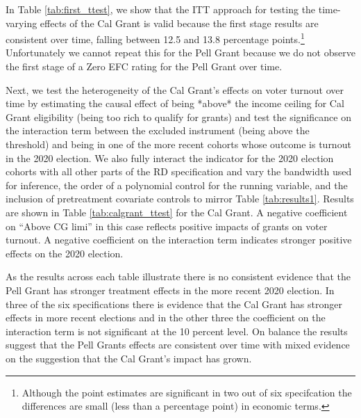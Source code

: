 \documentclass[12pt,letterpaper,oneside]{book}
\begin{document}
In Table \ref{tab:first_ttest}, we show that the ITT approach for testing the time-varying effects of the Cal Grant is valid because the first stage results are consistent over time, falling between 12.5 and 13.8 percentage points.\footnote{Although the point estimates are significant in two out of six specifcation the differences are small (less than a percentage point) in economic terms.} Unfortunately we cannot repeat this for the Pell Grant because we do not observe the first stage of a Zero EFC rating for the Pell Grant over time.

Next, we test the heterogeneity of the Cal Grant's effects on voter turnout over time by estimating the causal effect of being *above* the income ceiling for Cal Grant eligibility (being too rich to qualify for grants) and test the significance on the interaction term between the excluded instrument (being above the threshold) and being in one of the more recent cohorts whose outcome is turnout in the 2020 election. We also fully interact the indicator for the 2020 election cohorts with all other parts of the RD specification and vary the bandwidth used for inference, the order of a polynomial control for the running variable, and the inclusion of pretreatment covariate controls to mirror Table \ref{tab:results1}. Results are shown in Table \ref{tab:calgrant_ttest} for the Cal Grant. A negative coefficient on ``Above CG limi'' in this case reflects positive impacts of grants on voter turnout. A negative coefficient on the interaction term indicates stronger positive effects on the 2020 election.

As the results across each table illustrate there is no consistent evidence that the Pell Grant has stronger treatment effects in the more recent 2020 election. In three of the six specifications there is evidence that the Cal Grant has stronger effects in more recent elections and in the other three the coefficient on the interaction term is not significant at the 10 percent level. On balance the results suggest that the Pell Grants effects are consistent over time with mixed evidence on the suggestion that the Cal Grant’s impact has grown.
\end{document}
